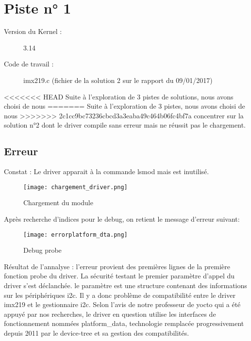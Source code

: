 \chapter{Piste n° 1} %
\label{Chapter2} %

\begin{description}
  \item[Version du Kernel :] 3.14
  \item[Code de travail :] imx219.c (fichier de la solution 2 sur le rapport du
  09/01/2017)
\end{description}

<<<<<<< HEAD
Suite à l'exploration de 3 pistes de solutions, nous avons choisi de nous
=======
Suite à l'exploration de 3 pistes, nous avons choisi de nous
>>>>>>> 2c1cc9bc73236cbcd3a3eaba49c464b06fc4bf7a
concentrer sur la solution n°2 dont le driver compile sans erreur mais ne
réussit pas le chargement.

\section{Erreur}
Constat : Le driver apparait à la commande lsmod mais est inutilisé.

\begin{figure}[th]
   \centering
   \texttt{[image: chargement\_driver.png]}
   \decoRule
   \caption{Chargement du module}  \label{fig:planning}
\end{figure}

Après recherche d'indices pour le debug, on retient le message d'erreur suivant:
\begin{figure}[th]
  \centering
  \texttt{[image: errorplatform\_dta.png]}
  \decoRule
  \caption{Debug probe}  \label{fig:planning}
\end{figure}

Résultat de l'annalyse :
l'erreur provient des premières lignes de la première fonction probe du driver. La
sécurité testant le premier paramètre d'appel du driver s'est déclanchée. le
paramètre est une structure contenant des informations sur les périphériques i2c.
Il y a donc problème de compatibilité entre le driver imx219 et le gestionnaire i2c. Selon
l'avis de notre professeur de yocto qui a été appuyé par nos recherches,
le driver en question utilise les interfaces de fonctionnement nommées
platform\_data, technologie remplacée progressivement depuis 2011 par le
device-tree et sa gestion des compatibilités.

